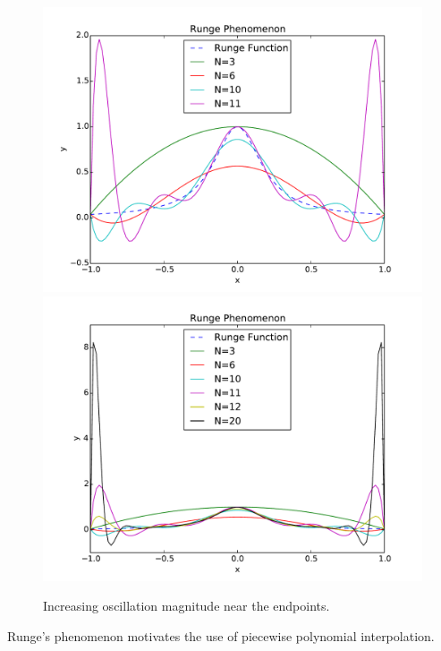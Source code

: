 \begin{figure}
    \centering
    \includegraphics[width=\textwidth]{images/runge11.pdf}
    \includegraphics[width=\textwidth]{images/runge20.pdf}
    \caption{Increasing oscillation magnitude near the endpoints.}
    \label{fig:20:rungephen}
\end{figure}
Runge's phenomenon motivates the use of piecewise polynomial interpolation.

